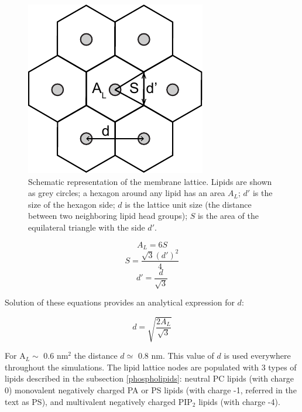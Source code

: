 \begin{figure}[!ht]
\begin{center}
  \includegraphics[scale=1.2]{../figures/lipid_area.pdf}
\end{center}
 \caption[Schematic representation of the membrane lattice]{Schematic representation of the membrane lattice. Lipids are shown as grey circles; a hexagon around any lipid has an area $A_L$; $d'$ is the size of the hexagon side; $d$ is the lattice unit size (the distance between two neighboring lipid head groups); $S$ is the area of the equilateral triangle with the side $d'$.}
\label{fig:lipid_area}
\end{figure}


\begin{equation}
 A_L = 6 S
\end{equation}
\begin{equation}
 S = \frac{\sqrt{3}(d')^2}{4}
\end{equation}
\begin{equation}
 d' = \frac{d}{\sqrt{3}}
\end{equation}

Solution of these equations provides an analytical expression for $d$:

\begin{equation}
 d = \sqrt{\frac{2A_L}{\sqrt{3}}}
\end{equation}

For A$_L \sim$ 0.6 nm$^2$ the distance $d\simeq$ 0.8 nm. This value of $d$ is used everywhere throughout the simulations. The lipid lattice nodes are populated with 3 types of lipids described in the subsection \ref{phospholipids}: neutral PC lipids (with charge 0) monovalent negatively charged PA or PS lipids (with charge -1, referred in the text as PS), and multivalent negatively charged PIP$_2$ lipids (with charge -4).


